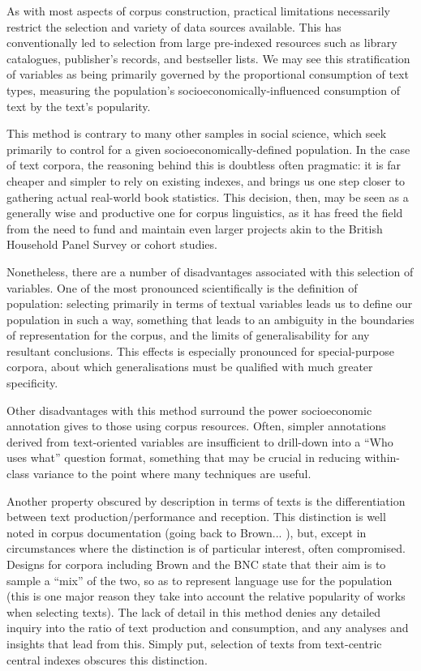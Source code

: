 As with most aspects of corpus construction, practical limitations necessarily restrict the selection and variety of data sources available.  This has conventionally led to selection from large pre-indexed resources such as library catalogues, publisher's records, and bestseller lists.  We may see this stratification of variables as being primarily governed by the proportional consumption of text types, measuring the population's socioeconomically-influenced consumption of text by the text's popularity.

This method is contrary to many other samples in social science, which seek primarily to control for a given socioeconomically-defined population.  In the case of text corpora, the reasoning behind this is doubtless often pragmatic: it is far cheaper and simpler to rely on existing indexes, and brings us one step closer to gathering actual real-world book statistics.  This decision, then, may be seen as a generally wise and productive one for corpus linguistics, as it has freed the field from the need to fund and maintain even larger projects akin to the British Household Panel Survey or cohort studies.

Nonetheless, there are a number of disadvantages associated with this selection of variables.  One of the most pronounced scientifically is the definition of population: selecting primarily in terms of textual variables leads us to define our population in such a way, something that leads to an ambiguity in the boundaries of representation for the corpus, and the limits of generalisability for any resultant conclusions.  This effects is especially pronounced for special-purpose corpora, about which generalisations must be qualified with much greater specificity.

Other disadvantages with this method surround the power socioeconomic annotation gives to those using corpus resources.  Often, simpler annotations derived from text-oriented variables are insufficient to drill-down into a ``Who uses what'' question format, something that may be crucial in reducing within-class variance to the point where many techniques are useful.

Another property obscured by description in terms of texts is the differentiation between text production/performance and reception.  This distinction is well noted in corpus documentation (going back to Brown... %
), but, except in circumstances where the distinction is of particular interest, often compromised.  Designs for corpora including Brown and the BNC state that their aim is to sample a ``mix'' of the two, so as to represent language use for the population (this is one major reason they take into account the relative popularity of works when selecting texts).  The lack of detail in this method denies any detailed inquiry into the ratio of text production and consumption, and any analyses and insights that lead from this.  Simply put, selection of texts from text-centric central indexes obscures this distinction.

